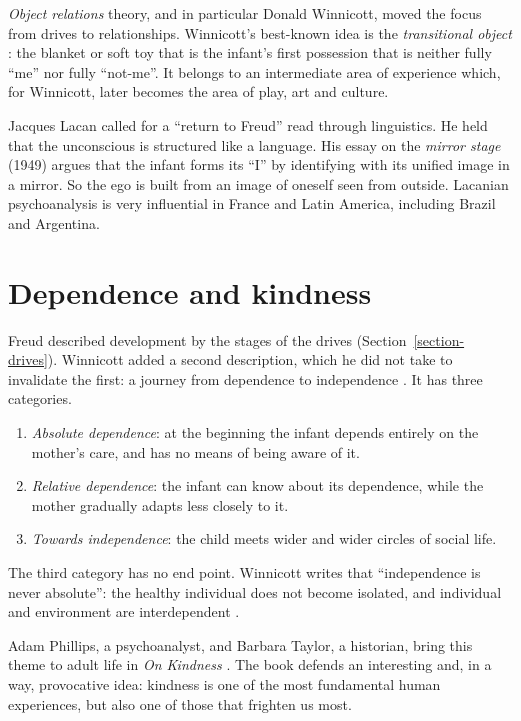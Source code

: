 \emph{Object relations} theory, and in
particular Donald Winnicott, moved the
focus from drives to relationships.
Winnicott's best-known idea is the
\emph{transitional object}
\cite{winnicott-transitional-1953}: the
blanket or soft toy that is the infant's
first possession that is neither fully
``me'' nor fully ``not-me''. It belongs
to an intermediate area of experience
which, for Winnicott, later becomes the
area of play, art and culture.

Jacques Lacan called for a ``return to
Freud'' read through linguistics. He
held that the unconscious is structured
like a language. His essay on the
\emph{mirror stage} (1949)
\cite{lacan-ecrits-fink} argues that the
infant forms its ``I'' by identifying
with its unified image in a mirror. So
the ego is built from an image of
oneself seen from outside. Lacanian
psychoanalysis is very influential in
France and Latin America, including
Brazil and Argentina.

\section{Dependence and kindness}
\label{section-dependence-kindness}

Freud described development by the
stages of the drives
(Section~\ref{section-drives}).
Winnicott added a second description,
which he did not take to invalidate the
first: a journey from dependence to
independence
\cite[Chapter 7]{winnicott-maturational}.
It has three categories.

\begin{enumerate}
\item \emph{Absolute dependence}: at the
beginning the infant depends entirely on
the mother's care, and has no means of
being aware of it.
\item \emph{Relative dependence}: the
infant can know about its dependence,
while the mother gradually adapts less
closely to it.
\item \emph{Towards independence}: the
child meets wider and wider circles of
social life.
\end{enumerate}

The third category has no end point.
Winnicott writes that ``independence is
never absolute'': the healthy individual
does not become isolated, and individual
and environment are interdependent
\cite[p.~84]{winnicott-maturational}.

Adam Phillips, a psychoanalyst, and
Barbara Taylor, a historian, bring this
theme to adult life in \emph{On Kindness}
\cite{phillips-taylor-kindness}. The book
defends an interesting and, in a way,
provocative idea: kindness is one of the
most fundamental human experiences, but
also one of those that frighten us most.


